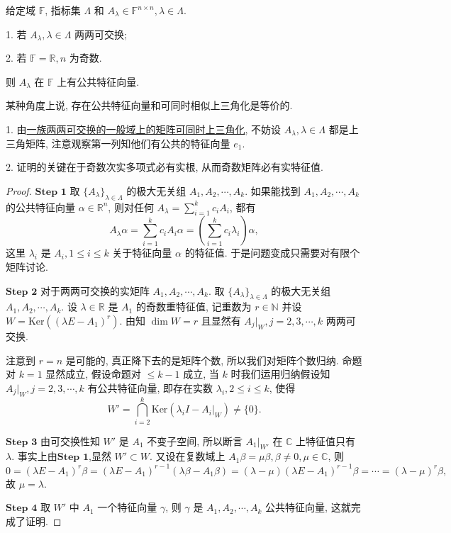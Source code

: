 \documentclass[../../main.tex]{subfiles}
\begin{document}
\begin{theorem}[公共特征值]\label{theorem:公共特征值}
给定域 \( \mathbb{F} \), 指标集 \( \Lambda \) 和 \( A_\lambda \in \mathbb{F}^{n \times n}, \lambda \in \Lambda \).

1. 若 \( A_\lambda, \lambda \in \Lambda \) 两两可交换;

2. 若 \( \mathbb{F} = \mathbb{R}, n \) 为奇数.

则 \( A_\lambda \) 在 \( \mathbb{F} \) 上有公共特征向量.
\end{theorem}
\begin{note}
某种角度上说, 存在公共特征向量和可同时相似上三角化是等价的.

1. 由\hyperref[proposition:一族两两可交换的一般域上的矩阵可同时上三角化]{一族两两可交换的一般域上的矩阵可同时上三角化}, 不妨设 \( A_\lambda, \lambda \in \Lambda \) 都是上三角矩阵, 注意观察第一列知他们有公共的特征向量 \( e_1 \).

2. 证明的关键在于奇数次实多项式必有实根, 从而奇数矩阵必有实特征值.
\end{note}
\begin{proof} 
$\mathbf{Step}\,\,\mathbf{1}$ 取 \( \{A_\lambda\}_{\lambda \in \Lambda} \) 的极大无关组 \( A_1, A_2, \cdots, A_k \). 如果能找到 \( A_1, A_2, \cdots, A_k \) 的公共特征向量 \( \alpha \in \mathbb{R}^n \), 则对任何 \( A_\lambda = \sum_{i=1}^k c_i A_i \), 都有
\[
A_\lambda \alpha = \sum_{i=1}^k c_i A_i \alpha = \left( \sum_{i=1}^k c_i \lambda_i \right) \alpha,
\]
这里 \( \lambda_i \) 是 \( A_i, 1 \leqslant i \leqslant k \) 关于特征向量 \( \alpha \) 的特征值. 于是问题变成只需要对有限个矩阵讨论.

$\mathbf{Step}\,\,\mathbf{2}$ 对于两两可交换的实矩阵 \( A_1, A_2, \cdots, A_k \). 取 \( \{A_\lambda\}_{\lambda \in \Lambda} \) 的极大无关组 \( A_1, A_2, \cdots, A_k \). 设 \( \lambda \in \mathbb{R} \) 是 \( A_1 \) 的奇数重特征值, 记重数为 \( r \in \mathbb{N} \) 并设 \( W = \mathrm{Ker} \left( (\lambda E - A_1)^r \right) \). 由知 \( \dim W = r \) 且显然有 \( A_j|_W, j = 2, 3, \cdots, k \) 两两可交换.

注意到 \( r = n \) 是可能的, 真正降下去的是矩阵个数, 所以我们对矩阵个数归纳. 命题对 \( k = 1 \) 显然成立, 假设命题对 \( \leqslant k - 1 \) 成立, 当 \( k \) 时我们运用归纳假设知 \( A_j|_W, j = 2, 3, \cdots, k \) 有公共特征向量, 即存在实数 \( \lambda_i, 2 \leqslant i \leqslant k \), 使得
\[
W' = \bigcap_{i=2}^k \mathrm{Ker} \left( \lambda_i I - A_i|_W \right) \neq \{0\}.
\]

$\mathbf{Step}\,\,\mathbf{3}$ 由可交换性知 \( W' \) 是 \( A_1 \) 不变子空间, 所以断言 \( A_1|_{W'} \) 在 \( \mathbb{C} \) 上特征值只有 \( \lambda \). 事实上由$\mathbf{Step}\,\,\mathbf{1}$,显然 \( W' \subset W \). 又设在复数域上 \( A_1 \beta = \mu \beta, \beta \neq 0, \mu \in \mathbb{C} \), 则
\[
0 = (\lambda E - A_1)^r \beta = (\lambda E - A_1)^{r - 1} (\lambda \beta - A_1 \beta) = (\lambda - \mu)(\lambda E - A_1)^{r - 1} \beta = \cdots = (\lambda - \mu)^r \beta,
\]
故 \( \mu = \lambda \).

$\mathbf{Step}\,\,\mathbf{4}$ 取 \( W' \) 中 \( A_1 \) 一个特征向量 \( \gamma \), 则 \( \gamma \) 是 \( A_1, A_2, \cdots, A_k \) 公共特征向量, 这就完成了证明.
\end{proof}
\end{document}

